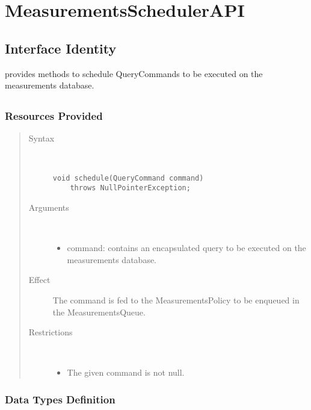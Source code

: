 \section{MeasurementsSchedulerAPI}
\label{api:measurements-scheduler-api}

\subsection{Interface Identity}

\npar {} provides methods to schedule
QueryCommands to be executed on the measurements database.

\subsection{}

\subsubsection{Resources Provided}

\begin{quote}
	\begin{description}
		\item[Syntax] \ 
		\begin{verbatim}
void schedule(QueryCommand command)
    throws NullPointerException;
		\end{verbatim}
		\item[Arguments] \
		\begin{itemize}
			\item command: contains an encapsulated query to be executed on the
			measurements database.
		\end{itemize}
		\item[Effect] The command is fed to the MeasurementsPolicy to be enqueued in
		the MeasurementsQueue.
		\item[Restrictions] \ 
		\begin{itemize}
			\item The given command is not null.
		\end{itemize}
	\end{description} 
\end{quote}

\subsubsection{Data Types Definition}


